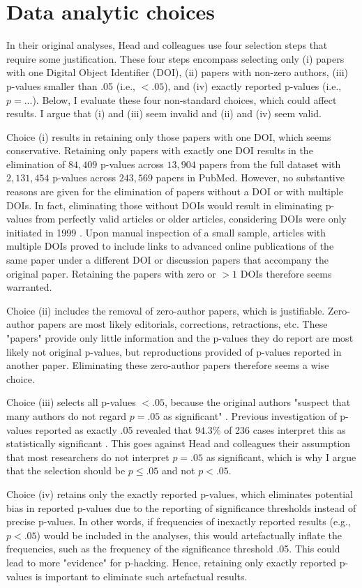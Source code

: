 \section*{Data analytic choices}
In their original analyses, Head and colleagues use four selection steps that require some justification. These four steps encompass selecting only (i) papers with one Digital Object Identifier (DOI), (ii) papers with non-zero authors, (iii) p-values smaller than .05 (i.e., $<.05$), and (iv) exactly reported p-values (i.e., $p = ...$). Below, I evaluate these four non-standard choices, which could affect results. I argue that (i) and (iii) seem invalid and (ii) and (iv) seem valid.

Choice (i) results in retaining only those papers with one DOI, which seems conservative. Retaining only papers with exactly one DOI results in the elimination of $84,409$ p-values across $13,904$ papers from the full dataset with $2,131,454$ p-values across $243,569$ papers in PubMed. However, no substantive reasons are given for the elimination of papers without a DOI or with multiple DOIs. In fact, eliminating those without DOIs would result in eliminating p-values from perfectly valid articles or older articles, considering DOIs were only initiated in 1999 \cite{Crossre2009}. Upon manual inspection of a small sample, articles with multiple DOIs proved to include links to advanced online publications of the same paper under a different DOI or discussion papers that accompany the original paper. Retaining the papers with zero or $>1$ DOIs therefore seems warranted.

Choice (ii) includes the removal of zero-author papers, which is justifiable. Zero-author papers are most likely editorials, corrections, retractions, etc. These "papers" provide only little information and the p-values they do report are most likely not original p-values, but reproductions provided of p-values reported in another paper. Eliminating these zero-author papers therefore seems a wise choice.

Choice (iii) selects all p-values $<.05$, because the original authors "suspect that many authors do not regard $p=.05$ as significant" \cite{Head2015}. Previous investigation of p-values reported as exactly .05 revealed that $94.3\%$ of 236 cases interpret this as statistically significant \cite{Nuijten2015}. This goes against Head and colleagues their assumption that most researchers do not interpret $p=.05$ as significant, which is why I argue that the selection should be $p\leq.05$ and not $p<.05$.

Choice (iv) retains only the exactly reported p-values, which eliminates potential bias in reported p-values due to the reporting of significance thresholds instead of precise p-values. In other words, if frequencies of inexactly reported results (e.g., $p<.05$) would be included in the analyses, this would artefactually inflate the frequencies, such as the  frequency of the significance threshold .05. This could lead to more "evidence" for p-hacking. Hence, retaining only exactly reported p-values is important to eliminate such artefactual results.